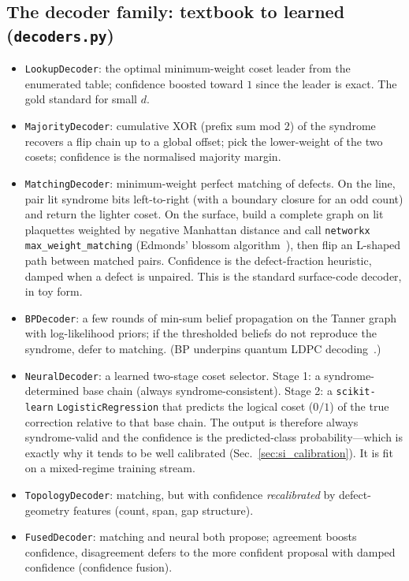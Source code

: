 \documentclass[reprint,aps,prxquantum,amsmath,amssymb,floatfix,nofootinbib,longbibliography]{revtex4-2}
\theoremstyle{definition}
\theoremstyle{remark}
\theoremstyle{plain}
\begin{document}
\subsection{The decoder family: textbook to learned (\texttt{decoders.py})}
\label{sec:si_family}
\begin{itemize}[leftmargin=1.5em]
  \item \texttt{LookupDecoder}: the optimal minimum-weight coset leader from the enumerated table; confidence boosted toward $1$ since the leader is exact. The gold standard for small $d$.
  \item \texttt{MajorityDecoder}: cumulative XOR (prefix sum mod $2$) of the syndrome recovers a flip chain up to a global offset; pick the lower-weight of the two cosets; confidence is the normalised majority margin.
  \item \texttt{MatchingDecoder}: minimum-weight perfect matching of defects. On the line, pair lit syndrome bits left-to-right (with a boundary closure for an odd count) and return the lighter coset. On the surface, build a complete graph on lit plaquettes weighted by negative Manhattan distance and call \texttt{networkx max\_weight\_matching} (Edmonds' blossom algorithm~\cite{edmonds1965paths}), then flip an L-shaped path between matched pairs. Confidence is the defect-fraction heuristic, damped when a defect is unpaired. This is the standard surface-code decoder, in toy form.
  \item \texttt{BPDecoder}: a few rounds of min-sum belief propagation on the Tanner graph with log-likelihood priors; if the thresholded beliefs do not reproduce the syndrome, defer to matching. (BP underpins quantum LDPC decoding~\cite{poulin2008iterative,roffe2020decoding}.)
  \item \texttt{NeuralDecoder}: a learned two-stage coset selector. Stage 1: a syndrome-determined base chain (always syndrome-consistent). Stage 2: a \texttt{scikit-learn} \texttt{LogisticRegression} that predicts the logical coset ($0/1$) of the true correction relative to that base chain. The output is therefore always syndrome-valid and the confidence is the predicted-class probability---which is exactly why it tends to be well calibrated (Sec.~\ref{sec:si_calibration}). It is fit on a mixed-regime training stream.
  \item \texttt{TopologyDecoder}: matching, but with confidence \emph{recalibrated} by defect-geometry features (count, span, gap structure).
  \item \texttt{FusedDecoder}: matching and neural both propose; agreement boosts confidence, disagreement defers to the more confident proposal with damped confidence (confidence fusion).

\end{itemize}
\end{document}
